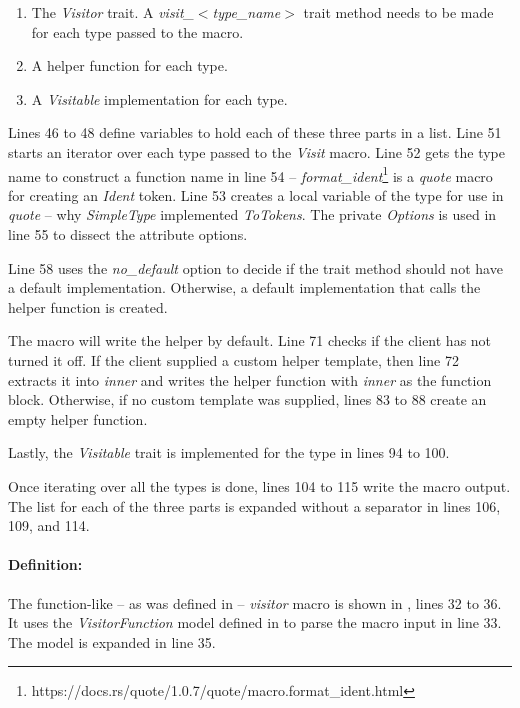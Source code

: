 \begin{enumerate}
	\item The \textit{Visitor} trait.
	      A \textit{visit\_$<$type\_name$>$} trait method needs to be made for each type passed to the macro.
	\item A helper function for each type.
	\item A \textit{Visitable} implementation for each type.
\end{enumerate}

Lines 46 to 48 define variables to hold each of these three parts in a list.
Line 51 starts an iterator over each type passed to the \textit{Visit} macro.
Line 52 gets the type name to construct a function name in line 54 -- \textit{format\_ident}\footnote{https://docs.rs/quote/1.0.7/quote/macro.format\_ident.html} is a \textit{quote} macro for creating an \textit{Ident} token.
Line 53 creates a local variable of the type for use in \textit{quote} -- why \textit{SimpleType} implemented \textit{ToTokens}.
The private \textit{Options} is used in line 55 to dissect the attribute options.

Line 58 uses the \textit{no\_default} option to decide if the trait method should not have a default implementation.
Otherwise, a default implementation that calls the helper function is created.

The macro will write the helper by default.
Line 71 checks if the client has not turned it off.
If the client supplied a custom helper template, then line 72 extracts it into \textit{inner} and writes the helper function with \textit{inner} as the function block.
Otherwise, if no custom template was supplied, lines 83 to 88 create an empty helper function.

Lastly, the \textit{Visitable} trait is implemented for the type in lines 94 to 100.

Once iterating over all the types is done, lines 104 to 115 write the macro output.
The list for each of the three parts is expanded without a separator in lines 106, 109, and 114.

\paragraph{Definition:}
The function-like -- as was defined in  -- \textit{visitor} macro is shown in , lines 32 to 36.
It uses the \textit{VisitorFunction} model defined in  to parse the macro input in line 33.
The model is expanded in line 35.